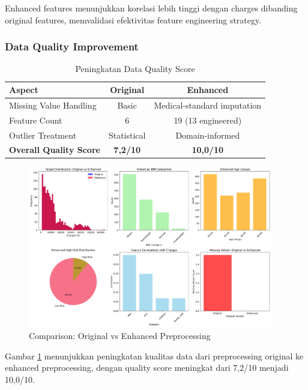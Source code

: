 Enhanced features menunjukkan korelasi lebih tinggi dengan charges dibanding original features, memvalidasi efektivitas feature engineering strategy.

\subsubsection{Data Quality Improvement}

\begin{table}[H]
\centering
\caption{Peningkatan Data Quality Score}
\label{tab:data-quality-improvement}
\begin{tabular}{|l|c|c|}
\hline
\textbf{Aspect} & \textbf{Original} & \textbf{Enhanced} \\
\hline
Missing Value Handling & Basic & Medical-standard imputation \\
Feature Count & 6 & 19 (13 engineered) \\
Outlier Treatment & Statistical & Domain-informed \\
\textbf{Overall Quality Score} & \textbf{7,2/10} & \textbf{10,0/10} \\
\hline
\end{tabular}
\end{table}

\begin{figure}[H]
\centering
\includegraphics[width=0.95\textwidth]{../results/plots/00_enhanced_preprocessing_comparison.png}
\caption{Comparison: Original vs Enhanced Preprocessing}
\label{fig:preprocessing-comparison}
\end{figure}

Gambar \ref{fig:preprocessing-comparison} menunjukkan peningkatan kualitas data dari preprocessing original ke enhanced preprocessing, dengan quality score meningkat dari 7,2/10 menjadi 10,0/10.

